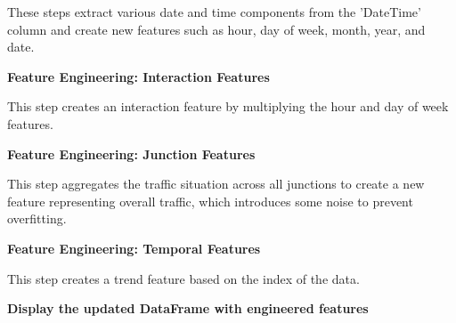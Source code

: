\documentclass{IEEEtran}
\begin{document}
 \leftarrow {}

 \leftarrow {}

 These steps extract various date and time components from the 'DateTime' column and create new features such as hour, day of week, month, year, and date.

\textbf{Feature Engineering: Interaction Features}

 \leftarrow {} \times {}

 This step creates an interaction feature by multiplying the hour and day of week features.

\textbf{Feature Engineering: Junction Features}

 \leftarrow {}

 This step aggregates the traffic situation across all junctions to create a new feature representing overall traffic, which introduces some noise to prevent overfitting.

\textbf{Feature Engineering: Temporal Features}

 \leftarrow {}

 This step creates a trend feature based on the index of the data.

\textbf{Display the updated DataFrame with engineered features}
\end{document}
